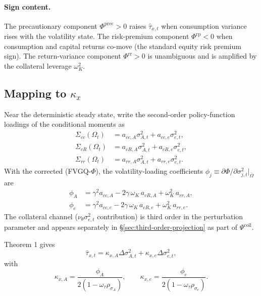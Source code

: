 \documentclass[11pt]{article}
\theoremstyle{plain}
\theoremstyle{definition}
\begin{document}
\paragraph{Sign content.}
The precautionary component $\Phi^{\mathrm{prec}}>0$ raises $\hat\tau_{x,t}$
when consumption variance rises with the volatility state. The risk-premium
component $\Phi^{\mathrm{rp}}<0$ when consumption and capital returns
co-move (the standard equity risk premium sign). The return-variance
component $\Phi^{\mathrm{rr}}>0$ is unambiguous and is amplified by the
collateral leverage $\omega_K^2$.

\subsection{Mapping to \texorpdfstring{$\kappa_x$}{kappa x}}

Near the deterministic steady state, write the second-order policy-function
loadings of the conditional moments as
\begin{align}
\Sigma_{cc}(\Omega_t)
&= a_{cc,A}\sigma_{A,t}^2+a_{cc,e}\sigma_{e,t}^2,\\
\Sigma_{cR}(\Omega_t)
&= a_{cR,A}\sigma_{A,t}^2+a_{cR,e}\sigma_{e,t}^2,\\
\Sigma_{rr}(\Omega_t)
&= a_{rr,A}\sigma_{A,t}^2+a_{rr,e}\sigma_{e,t}^2.
\end{align}
With the corrected (FVGQ-$\Phi$), the volatility-loading coefficients
$\phi_j \equiv \partial\Phi/\partial\sigma_{j,t}^2|_{\bar\Omega}$ are
\begin{align}
\phi_A
&= \gamma^2 a_{cc,A}
- 2\gamma\,\omega_K\, a_{cR,A}
+ \omega_K^2\, a_{rr,A},
\tag{phiA}\\
\phi_e
&= \gamma^2 a_{cc,e}
- 2\gamma\,\omega_K\, a_{cR,e}
+ \omega_K^2\, a_{rr,e}.
\tag{phie}
\end{align}
The collateral channel ($\nu_\theta\sigma_{e,t}^2$ contribution) is third
order in the perturbation parameter and appears separately in
§\ref{sec:third-order-projection} as part of $\Psi^{\mathrm{coll}}$.

Theorem 1 gives
\begin{equation}
\hat\tau_{x,t}
= \kappa_{x,A}\Delta\sigma_{A,t}^2 + \kappa_{x,e}\Delta\sigma_{e,t}^2,
\tag{Kappa-map}
\end{equation}
with
\begin{equation}
\kappa_{x,A}
= \frac{\phi_A}{2(1-\omega_\tau\rho_{\sigma_A})},
\qquad
\kappa_{x,e}
= \frac{\phi_e}{2(1-\omega_\tau\rho_{\sigma_e})}.
\tag{Kappa}
\end{equation}
\end{document}
